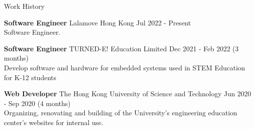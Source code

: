 \documentclass{resume} %
\begin{document}
\begin{rSection}{Work History}
    \vspace{-1.25em}
    \item \textbf{Software Engineer} {Lalamove Hong Kong} \hfill Jul 2022 - Present \\
    Software Engineer.
    \item \textbf{Software Engineer} {TURNED-E! Education Limited} \hfill Dec 2021 - Feb 2022 (3 months) \\
    Develop software and hardware for embedded systems used in STEM Education for K-12 students
    \item \textbf{Web Developer} {The Hong Kong University of Science and Technology} \hfill Jun 2020 - Sep 2020 (4 months) \\
    Organizing, renovating and building of the University's engineering education center's websites for internal use.
\end{rSection}

\end{document}
